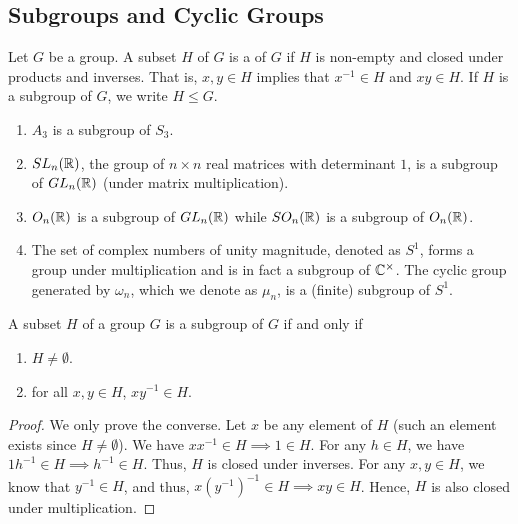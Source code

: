 \subsection{Subgroups and Cyclic Groups}


\begin{defn}
    Let $G$ be a group. A subset $H$ of $G$ is a  of $G$ if $H$ is non-empty and closed under products and inverses. That is, $x,y \in H$ implies that $x^{-1} \in H$ and $xy \in H$. If $H$ is a subgroup of $G$, we write $H \leq G$.
\end{defn}

\begin{ex}
    \phantom{hi}
    \begin{enumerate}
        \item $A_3$ is a subgroup of $S_3$.
        \item $SL_n(\mathbb{R})$, the group of $n \times n$ real matrices with determinant $1$, is a subgroup of $GL_n(\mathbb{R})$ (under matrix multiplication).
        \item $O_n(\mathbb{R})$ is a subgroup of $GL_n(\mathbb{R})$ while $SO_n(\mathbb{R})$ is a subgroup of $O_n(\mathbb{R})$.
        \item The set of complex numbers of unity magnitude, denoted as $S^1$, forms a group under multiplication and is in fact a subgroup of $\mathbb{C}^{\times}$. The cyclic group generated by $\omega_n$, which we denote as $\mu_n$, is a (finite) subgroup of $S^1$.
    \end{enumerate}
\end{ex}


\begin{theorem} \label{thm:subgroup-criterion}
    A subset $H$ of a group $G$ is a subgroup of $G$ if and only if
    \begin{enumerate}
        \item $H \neq \emptyset$.
        \item for all $x,y \in H$, $xy^{-1} \in H$.
    \end{enumerate}
\end{theorem}
\begin{proof}
    We only prove the converse. Let $x$ be any element of $H$ (such an element exists since $H \neq \emptyset$). We have $xx^{-1} \in H \implies 1 \in H$. For any $h \in H$, we have $1h^{-1} \in H \implies h^{-1} \in H$. Thus, $H$ is closed under inverses. For any $x,y \in H$, we know that $y^{-1} \in H$, and thus, $x(y^{-1})^{-1} \in H \implies xy \in H$. Hence, $H$ is also closed under multiplication.
\end{proof}

